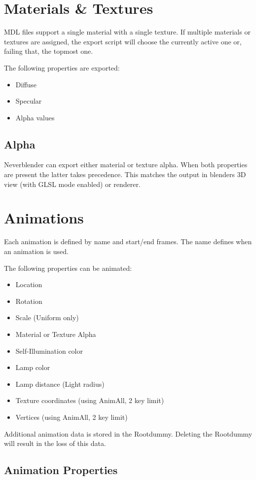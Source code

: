 \section{Materials \& Textures}
MDL files support a single material with a single texture. If multiple 
materials or textures are assigned, the export script will choose the currently 
active one or, failing that, the topmost one.

The following properties are exported:
\begin{itemize}
    \item Diffuse
    \item Specular
    \item Alpha values
\end{itemize}

\subsection*{Alpha}
Neverblender can export either material or texture alpha. When both properties are present 
the latter takes precedence. This matches the output in blenders 3D view (with GLSL mode enabled) 
or renderer.

\section{Animations}
Each animation is defined by name and start/end frames. The name 
defines when an animation is used.

The following properties can be animated:
\begin{itemize}
    \item Location
    \item Rotation
    \item Scale (Uniform only)
    \item Material or Texture Alpha
    \item Self-Illumination color
    \item Lamp color
    \item Lamp distance (Light radius)
    \item Texture coordinates (using AnimAll, 2 key limit)
    \item Vertices (using AnimAll, 2 key limit)
\end{itemize}
Additional animation data is stored in the Rootdummy. Deleting the Rootdummy will result in
the loss of this data.

\subsection{Animation Properties}

